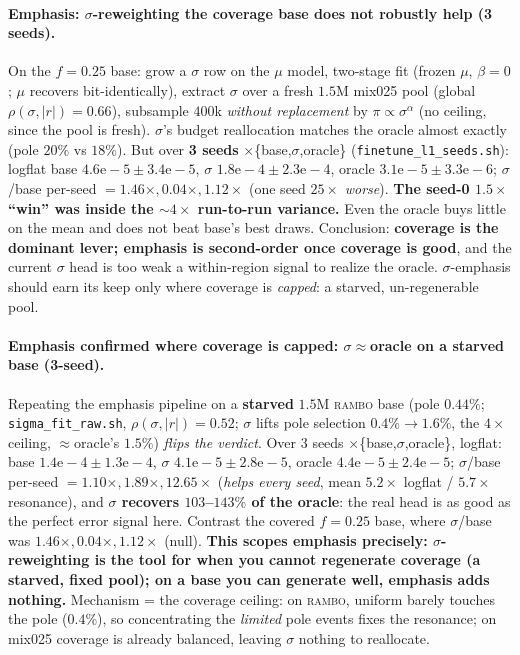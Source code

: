 \documentclass[11pt]{article}
\newcommand{\code}[1]{\texttt{#1}}
\begin{document}
\paragraph{Emphasis: $\sigma$-reweighting the coverage base does not robustly help (3 seeds).} On the $f{=}0.25$
base: grow a $\sigma$ row on the $\mu$ model, two-stage fit (frozen $\mu$, $\beta{=}0$; $\mu$ recovers
bit-identically), extract $\sigma$ over a fresh $1.5\mathrm{M}$ mix025 pool (global $\rho(\sigma,|r|){=}0.66$),
subsample $400$k \emph{without replacement} by $\pi\!\propto\!\sigma^\alpha$ (no ceiling, since the pool is fresh).
$\sigma$'s budget reallocation matches the oracle almost exactly (pole $20\%$ vs $18\%$). But over
\textbf{3 seeds} $\times$\{base,$\sigma$,oracle\} (\code{finetune\_l1\_seeds.sh}): logflat base
$4.6\mathrm{e}{-}5\!\pm\!3.4\mathrm{e}{-}5$, $\sigma$ $1.8\mathrm{e}{-}4\!\pm\!2.3\mathrm{e}{-}4$, oracle
$3.1\mathrm{e}{-}5\!\pm\!3.3\mathrm{e}{-}6$; $\sigma$/base per-seed $=1.46\times,0.04\times,1.12\times$ (one
seed $25\times$ \emph{worse}). \textbf{The seed-0 $1.5\times$ ``win'' was inside the $\sim$$4\times$
run-to-run variance.} Even the oracle buys little on the mean and does not beat base's best draws. Conclusion:
\textbf{coverage is the dominant lever; emphasis is second-order once coverage is good}, and the current $\sigma$ head is too weak a within-region signal to realize the oracle.
$\sigma$-emphasis should earn its keep only where coverage is \emph{capped}: a starved,
un-regenerable pool.

\paragraph{Emphasis confirmed where coverage is capped: $\sigma\!\approx\!$oracle on a starved base (3-seed).}
Repeating the emphasis pipeline on a \textbf{starved} $1.5\mathrm{M}$ \textsc{rambo} base (pole $0.44\%$;
\code{sigma\_fit\_raw.sh}, $\rho(\sigma,|r|){=}0.52$; $\sigma$ lifts pole selection $0.4\%\!\to\!1.6\%$,
the $4\times$ ceiling, $\approx$oracle's $1.5\%$) \emph{flips the verdict}. Over 3 seeds
$\times$\{base,$\sigma$,oracle\}, logflat: base $1.4\mathrm{e}{-}4\!\pm\!1.3\mathrm{e}{-}4$, $\sigma$
$4.1\mathrm{e}{-}5\!\pm\!2.8\mathrm{e}{-}5$, oracle $4.4\mathrm{e}{-}5\!\pm\!2.4\mathrm{e}{-}5$; $\sigma$/base
per-seed $=1.10\times,1.89\times,12.65\times$ (\emph{helps every seed}, mean $5.2\times$ logflat / $5.7\times$
resonance), and \textbf{$\sigma$ recovers $103$--$143\%$ of the oracle}: the real head is as good as the
perfect error signal here. Contrast the covered $f{=}0.25$ base, where $\sigma$/base was
$1.46\times,0.04\times,1.12\times$ (null). \textbf{This scopes emphasis precisely: $\sigma$-reweighting is the
tool for when you cannot regenerate coverage (a starved, fixed pool); on a base you can generate
well, emphasis adds nothing.} Mechanism = the coverage ceiling: on \textsc{rambo}, uniform barely touches
the pole ($0.4\%$), so concentrating the \emph{limited} pole events fixes the resonance; on mix025 coverage
is already balanced, leaving $\sigma$ nothing to reallocate.
\end{document}
